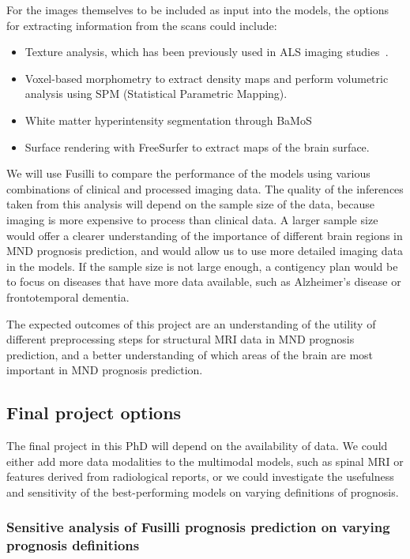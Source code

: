 For the images themselves to be included as input into the models, the options for extracting information from the scans could include:
\begin{itemize}
\setlength\itemsep{-0.5em}
    \item Texture analysis, which has been previously used in ALS imaging studies~\cite{ishaqueEvaluatingCerebralCorrelates2018, johnsQuantifyingChangesSusceptibility2019}.
    \item Voxel-based morphometry to extract density maps and perform volumetric analysis using SPM (Statistical Parametric Mapping).
    \item White matter hyperintensity segmentation through BaMoS~\cite{fifordAutomatedWhiteMatter2020}
    \item Surface rendering with FreeSurfer to extract maps of the brain surface.
\end{itemize}


We will use Fusilli to compare the performance of the models using various combinations of clinical and processed imaging data.
The quality of the inferences taken from this analysis will depend on the sample size of the data, because imaging is more expensive to process than clinical data.
A larger sample size would offer a clearer understanding of the importance of different brain regions in MND prognosis prediction, and would allow us to use more detailed imaging data in the models.
If the sample size is not large enough, a contigency plan would be to focus on diseases that have more data available, such as Alzheimer's disease or frontotemporal dementia.

The expected outcomes of this project are an understanding of the utility of different preprocessing steps for structural MRI data in MND prognosis prediction, and a better understanding of which areas of the brain are most important in MND prognosis prediction.


\subsection{Final project options}

The final project in this PhD will depend on the availability of data.
We could either add more data modalities to the multimodal models, such as spinal MRI or features derived from radiological reports, or we could investigate the usefulness and sensitivity of the best-performing models on varying definitions of prognosis.

\subsubsection*{Sensitive analysis of Fusilli prognosis prediction on varying prognosis definitions}

